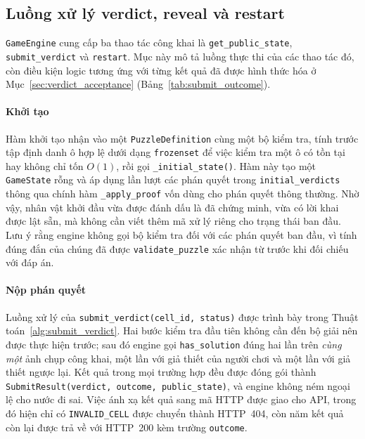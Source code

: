 \subsection{Luồng xử lý verdict, reveal và restart}
\label{sec:engine_flow}
\begin{sloppypar}

\texttt{GameEngine} cung cấp ba thao tác công khai là \texttt{get\_public\_state},
\texttt{submit\_verdict} và \texttt{restart}. Mục này mô tả luồng thực thi của
các thao tác đó, còn điều kiện logic tương ứng với từng kết quả đã được hình
thức hóa ở Mục~\ref{sec:verdict_acceptance} (Bảng~\ref{tab:submit_outcome}).

\paragraph{Khởi tạo}
Hàm khởi tạo nhận vào một \texttt{PuzzleDefinition} cùng một bộ kiểm tra, tính
trước tập định danh ô hợp lệ dưới dạng \texttt{frozenset} để việc kiểm tra một ô
có tồn tại hay không chỉ tốn $O(1)$, rồi gọi \texttt{\_initial\_state()}. Hàm
này tạo một \texttt{GameState} rỗng và áp dụng lần lượt các phán quyết trong
\texttt{initial\_verdicts} thông qua chính hàm \texttt{\_apply\_proof} vốn dùng
cho phán quyết thông thường. Nhờ vậy, nhân vật khởi đầu vừa được đánh dấu là đã
chứng minh, vừa có lời khai được lật sẵn, mà không cần viết thêm mã xử lý riêng
cho trạng thái ban đầu. Lưu ý rằng engine không gọi bộ kiểm tra đối với các
phán quyết ban đầu, vì tính đúng đắn của chúng đã được \texttt{validate\_puzzle}
xác nhận từ trước khi đối chiếu với đáp án.

\paragraph{Nộp phán quyết}
Luồng xử lý của \texttt{submit\_verdict(cell\_id, status)} được trình bày trong
Thuật toán~\ref{alg:submit_verdict}. Hai bước kiểm tra đầu tiên không cần đến
bộ giải nên được thực hiện trước; sau đó engine gọi \texttt{has\_solution} đúng
hai lần trên \emph{cùng một} ảnh chụp công khai, một lần với giả thiết của người
chơi và một lần với giả thiết ngược lại. Kết quả trong mọi trường hợp đều được
đóng gói thành \texttt{SubmitResult(verdict, outcome, public\_state)}, và engine
không ném ngoại lệ cho nước đi sai. Việc ánh xạ kết quả sang mã HTTP được giao cho
API, trong đó hiện chỉ có \texttt{INVALID\_CELL} được chuyển thành HTTP~404, còn
năm kết quả còn lại được trả về với HTTP~200 kèm trường \texttt{outcome}.


\end{sloppypar}
